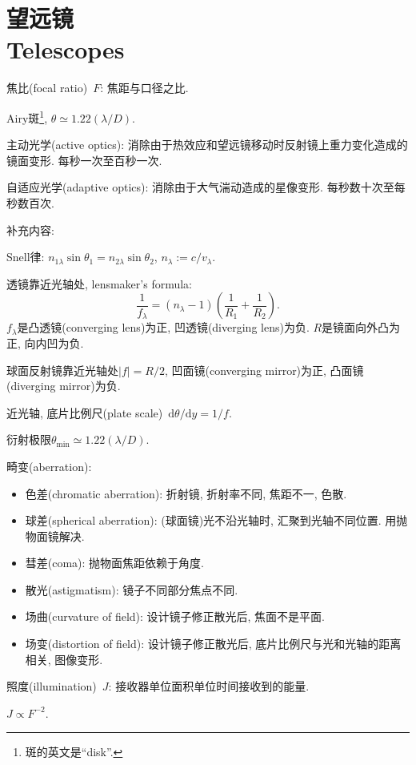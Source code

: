 \chapter{望远镜\\Telescopes}

焦比(focal ratio)~$F$: 焦距与口径之比.

Airy斑\footnote{斑的英文是``disk''.}, $\theta\simeq1.22(\lambda/D)$.

主动光学(active optics): 消除由于热效应和望远镜移动时反射镜上重力变化造成的镜面变形. 每秒一次至百秒一次.

自适应光学(adaptive optics): 消除由于大气湍动造成的星像变形. 每秒数十次至每秒数百次.

补充内容:

Snell律: $n_{1\lambda}\sin\theta_1=n_{2\lambda}\sin\theta_2$, $n_\lambda:=c/v_\lambda$.

透镜靠近光轴处, lensmaker's formula:
\begin{equation*}
    \frac{1}{f_\lambda}=(n_\lambda-1)\left(\frac{1}{R_1}+\frac{1}{R_2}\right).
\end{equation*}
$f_\lambda$是凸透镜(converging lens)为正, 凹透镜(diverging lens)为负. $R$是镜面向外凸为正, 向内凹为负.

球面反射镜靠近光轴处$\left\lvert f\right\rvert=R/2$, 凹面镜(converging mirror)为正, 凸面镜(diverging mirror)为负.

近光轴, 底片比例尺(plate scale)~$\mathrm{d}\theta/\mathrm{d}y=1/f$.

衍射极限$\theta_\text{min}\simeq1.22(\lambda/D)$.

畸变(aberration):
\begin{itemize}
    \item 色差(chromatic aberration): 折射镜, 折射率不同, 焦距不一, 色散.
    \item 球差(spherical aberration): (球面镜)光不沿光轴时, 汇聚到光轴不同位置. 用抛物面镜解决.
    \item 彗差(coma): 抛物面焦距依赖于角度.
    \item 散光(astigmatism): 镜子不同部分焦点不同.
    \item 场曲(curvature of field): 设计镜子修正散光后, 焦面不是平面.
    \item 场变(distortion of field): 设计镜子修正散光后, 底片比例尺与光和光轴的距离相关, 图像变形.
\end{itemize}

照度(illumination)~$J$: 接收器单位面积单位时间接收到的能量.

$J\propto F^{-2}$.

